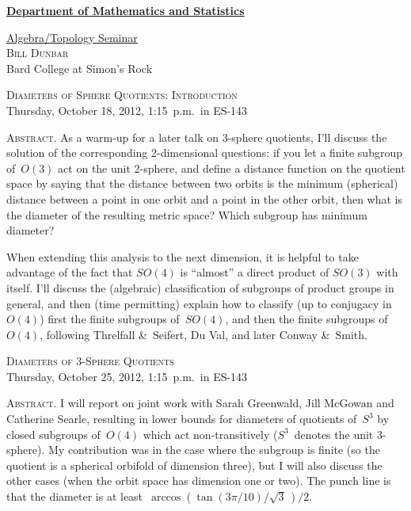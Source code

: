 \documentclass[12pt]{article}
\begin{document}
\thispagestyle{empty}

\noindent\hspace{-28pt}\raisebox{-19pt}{\XeTeXpicfile UAlogo.jpg scaled 340}%
\hfill\textsf{\textbf{\footnotesize\href{http://www.albany.edu/math/}{Department of Mathematics and Statistics}}}\bigskip

\begin{center}\Large
  \textsf{\huge \href{http://www.albany.edu/~mv312143/seminar/}{Algebra/Topology Seminar}}\\[1.5\bigskipamount]
  \textsc{\LARGE Bill Dunbar}\\
  Bard College at Simon's Rock\\[1\bigskipamount]
\end{center}
\noindent\hrulefill
\begin{center}\Large
  \textsc{\LARGE Diameters of Sphere Quotients: \Large Introduction}\\[.75\bigskipamount]
  Thursday, October 18, 2012, 1:15~p.m.\ in ES-143\\[1\bigskipamount]
\end{center}

\noindent\large\textsc{Abstract.}
As a warm-up for a later talk on 3-sphere quotients, I'll discuss the solution of the corresponding 2-dimensional questions: if you let a finite subgroup of~$O(3)$ act on the unit 2-sphere, and define a distance function on the quotient space by saying that the distance between two orbits is the minimum (spherical) distance between a point in one orbit and a point in the other orbit, then what is the diameter of the resulting metric space?  Which subgroup has minimum diameter?

When extending this analysis to the next dimension, it is helpful to take advantage of the fact that $SO(4)$ is ``almost'' a direct product of $SO(3)$ with itself.  I'll discuss the (algebraic) classification of subgroups of product groups in general, and then (time permitting) explain how to classify (up to conjugacy in~$O(4)$) first the finite subgroups of~$SO(4)$, and then the finite subgroups of~$O(4)$, following Threlfall \&~Seifert, Du Val, and later Conway \&~Smith.\bigskip

\noindent\hrulefill
\begin{center}\Large
  \textsc{\LARGE Diameters of 3-Sphere Quotients}\\[.75\bigskipamount]
  Thursday, October 25, 2012, 1:15~p.m.\ in ES-143\\[1\bigskipamount]
\end{center}

\noindent\large\textsc{Abstract.}
I will report on joint work with Sarah Greenwald, Jill McGowan and Catherine Searle, resulting in lower bounds for diameters of quotients of~$S^3$ by closed subgroups of~$O(4)$ which act non-transitively ($S^3$~denotes the unit 3-sphere).  My contribution was in the case where the subgroup is finite (so the quotient is a spherical orbifold of dimension three), but I will also discuss the other cases (when the orbit space has dimension one or two).  The punch line is that the diameter is at least~$\arccos\left(\tan(3\pi/10)/\sqrt{3}\,\right)\!/2$.
\end{document}
